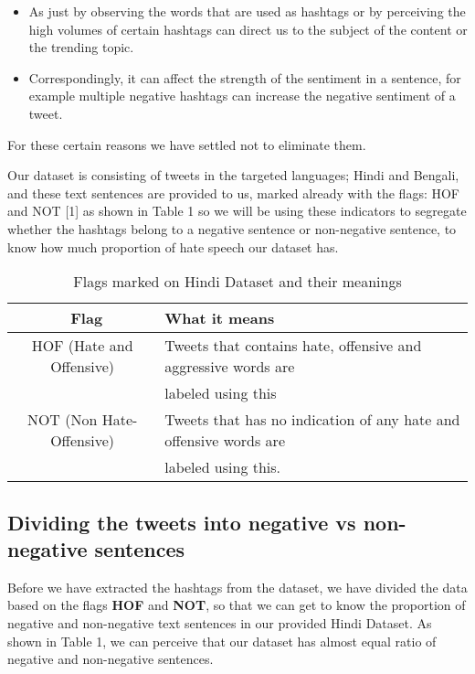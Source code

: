 \documentclass{article}
\begin{document}
\begin{itemize}
    \item As just by observing the words that are used as hashtags or by perceiving the high volumes of certain hashtags can direct us to the subject of the content or the trending topic. 
   \item Correspondingly, it can affect the strength of the sentiment in a sentence, for example multiple negative hashtags can increase the negative sentiment of a tweet.
\end{itemize}

For these certain reasons we have settled not to eliminate them. 

Our dataset is consisting of tweets in the targeted languages; Hindi and Bengali, and these text sentences are provided to us, marked already with the flags: HOF and NOT [1] as shown in Table 1 so we will be using these indicators to segregate whether the hashtags belong to a negative sentence or non-negative sentence, to know how much proportion of hate speech our dataset has.

\begin{table}

  \caption{Flags marked on Hindi Dataset and their meanings}
  \label{Table 3.0}
  \centering
  \begin{tabular}{cl}
    \toprule                \
    Flag     & What it means \\
    \midrule
    HOF (Hate and Offensive)     & Tweets that contains hate, offensive and aggressive words are \\ & labeled using this \\
    NOT (Non Hate-Offensive)     & Tweets that has no indication of any hate and offensive words are \\ & labeled using this.  \\
    \bottomrule
  \end{tabular}
\end{table}


\subsection{Dividing the tweets into negative vs non-negative sentences}

Before we have extracted the hashtags from the dataset, we have divided the data based on the flags \textbf{HOF} and \textbf{NOT}, so that we can get to know the proportion of negative and non-negative text sentences in our provided Hindi Dataset. As shown in Table 1, we can perceive that our dataset has almost equal ratio of negative and non-negative sentences. 
\end{document}

